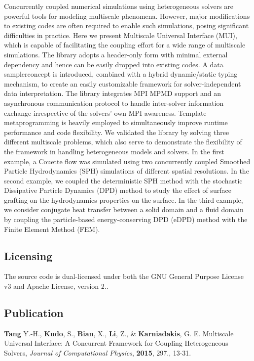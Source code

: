 Concurrently coupled numerical simulations using heterogeneous solvers are powerful tools for modeling multiscale phenomena. However, major modifications to existing codes are often required to enable such simulations, posing significant difficulties in practice. Here we present Multiscale Universal Interface (M\+UI), which is capable of facilitating the coupling effort for a wide range of multiscale simulations. The library adopts a header-\/only form with minimal external dependency and hence can be easily dropped into existing codes. A data samplerconcept is introduced, combined with a hybrid dynamic/static typing mechanism, to create an easily customizable framework for solver-\/independent data interpretation. The library integrates M\+PI M\+P\+MD support and an asynchronous communication protocol to handle inter-\/solver information exchange irrespective of the solvers’ own M\+PI awareness. Template metaprogramming is heavily employed to simultaneously improve runtime performance and code flexibility. We validated the library by solving three different multiscale problems, which also serve to demonstrate the flexibility of the framework in handling heterogeneous models and solvers. In the first example, a Couette flow was simulated using two concurrently coupled Smoothed Particle Hydrodynamics (S\+PH) simulations of different spatial resolutions. In the second example, we coupled the deterministic S\+PH method with the stochastic Dissipative Particle Dynamics (D\+PD) method to study the effect of surface grafting on the hydrodynamics properties on the surface. In the third example, we consider conjugate heat transfer between a solid domain and a fluid domain by coupling the particle-\/based energy-\/conserving D\+PD (e\+D\+PD) method with the Finite Element Method (F\+EM).

\subsection*{Licensing}

The source code is dual-\/licensed under both the G\+NU General Purpose License v3 and Apache License, version 2..

\subsection*{Publication}

{\bfseries Tang} Y.-\/H., {\bfseries Kudo}, S., {\bfseries Bian}, X., {\bfseries Li}, Z., \& {\bfseries Karniadakis}, G. E. Multiscale Universal Interface\+: A Concurrent Framework for Coupling Heterogeneous Solvers, {\itshape Journal of Computational Physics}, {\bfseries 2015}, 297., 13-\/31.

